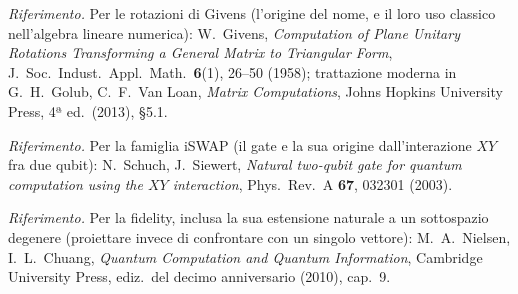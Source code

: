 \documentclass[11pt,a4paper]{article}
\begin{document}
\FloatBarrier

\bigskip
\noindent\footnotesize\textit{Riferimento.} Per le rotazioni di Givens
(l'origine del nome, e il loro uso classico nell'algebra lineare
numerica): W.~Givens, \emph{Computation of Plane Unitary Rotations
Transforming a General Matrix to Triangular Form}, J.~Soc.\ Indust.\ Appl.\
Math.\ \textbf{6}(1), 26--50 (1958); trattazione moderna in G.~H.~Golub,
C.~F.~Van Loan, \emph{Matrix Computations}, Johns Hopkins University Press,
4ª ed.\ (2013), \S5.1.

\noindent\textit{Riferimento.} Per la famiglia iSWAP (il gate e la sua
origine dall'interazione $XY$ fra due qubit): N.~Schuch, J.~Siewert,
\emph{Natural two-qubit gate for quantum computation using the $XY$
interaction}, Phys.\ Rev.\ A \textbf{67}, 032301 (2003).

\noindent\textit{Riferimento.} Per la fidelity, inclusa la sua estensione
naturale a un sottospazio degenere (proiettare invece di confrontare con un
singolo vettore): M.~A.~Nielsen, I.~L.~Chuang, \emph{Quantum Computation and
Quantum Information}, Cambridge University Press, ediz.\ del decimo
anniversario (2010), cap.~9.
\end{document}
